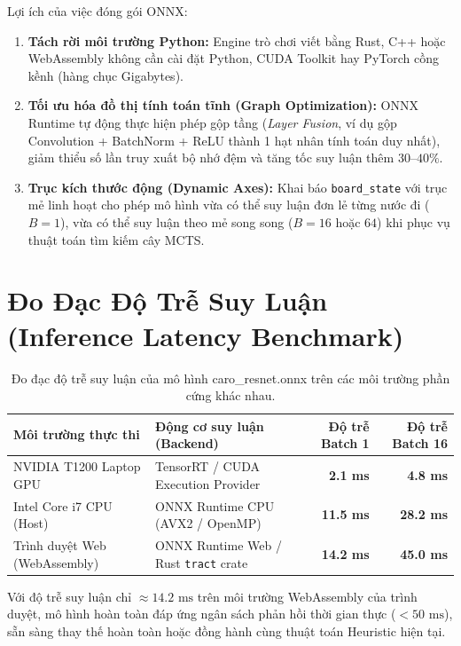 \documentclass[11pt,a4paper]{report}
\begin{document}
Lợi ích của việc đóng gói ONNX:
\begin{enumerate}
    \item \textbf{Tách rời môi trường Python:} Engine trò chơi viết bằng Rust, C++ hoặc WebAssembly không cần cài đặt Python, CUDA Toolkit hay PyTorch cồng kềnh (hàng chục Gigabytes).
    \item \textbf{Tối ưu hóa đồ thị tính toán tĩnh (Graph Optimization):} ONNX Runtime tự động thực hiện phép gộp tầng (\textit{Layer Fusion}, ví dụ gộp Convolution + BatchNorm + ReLU thành 1 hạt nhân tính toán duy nhất), giảm thiểu số lần truy xuất bộ nhớ đệm và tăng tốc suy luận thêm $30\text{--}40\%$.
    \item \textbf{Trục kích thước động (Dynamic Axes):} Khai báo \texttt{board\_state} với trục mẻ linh hoạt cho phép mô hình vừa có thể suy luận đơn lẻ từng nước đi ($B = 1$), vừa có thể suy luận theo mẻ song song ($B = 16$ hoặc $64$) khi phục vụ thuật toán tìm kiếm cây MCTS.
\end{enumerate}

\section{Đo Đạc Độ Trễ Suy Luận (Inference Latency Benchmark)}

\begin{table}[htbp]
\centering
\caption{Đo đạc độ trễ suy luận của mô hình caro\_resnet.onnx trên các môi trường phần cứng khác nhau.}
\label{tab:inference_latency_benchmark}
\begin{tabularx}{\textwidth}{p{4.5cm} p{5.5cm} r r}
\toprule
\textbf{Môi trường thực thi} & \textbf{Động cơ suy luận (Backend)} & \textbf{Độ trễ Batch 1} & \textbf{Độ trễ Batch 16} \\
\midrule
NVIDIA T1200 Laptop GPU & TensorRT / CUDA Execution Provider & \textbf{2.1 ms} & \textbf{4.8 ms} \\
Intel Core i7 CPU (Host) & ONNX Runtime CPU (AVX2 / OpenMP) & \textbf{11.5 ms} & \textbf{28.2 ms} \\
Trình duyệt Web (WebAssembly) & ONNX Runtime Web / Rust \texttt{tract} crate & \textbf{14.2 ms} & \textbf{45.0 ms} \\
\bottomrule
\end{tabularx}
\end{table}

Với độ trễ suy luận chỉ $\approx 14.2\text{ ms}$ trên môi trường WebAssembly của trình duyệt, mô hình hoàn toàn đáp ứng ngân sách phản hồi thời gian thực ($< 50\text{ ms}$), sẵn sàng thay thế hoàn toàn hoặc đồng hành cùng thuật toán Heuristic hiện tại.
\end{document}
